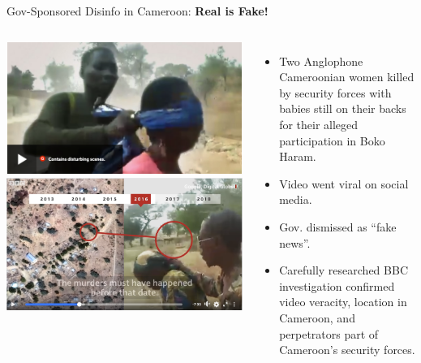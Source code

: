 \documentclass[nobackground,dvipsnames,table,aspectratio=169]{beamer}
\begin{document}
\begin{frame}{Gov-Sponsored Disinfo in Cameroon: \textbf{Real is Fake!}}
    \begin{columns}
            \includegraphics[width=\textwidth]{cameroon-disinfo-1}
            \includegraphics[width=\textwidth]{cameroon-disinfo-2}
            \begin{itemize}
                \item Two Anglophone Cameroonian women killed by security forces with babies still on their backs for their alleged participation in Boko Haram.
                \item Video went viral on social media.
                \item Gov. dismissed as “fake news”.
                \item Carefully researched BBC investigation confirmed video veracity, location in Cameroon, and perpetrators part of Cameroon’s security forces.
            \end{itemize}
    \end{columns}
\end{frame}
\end{document}
